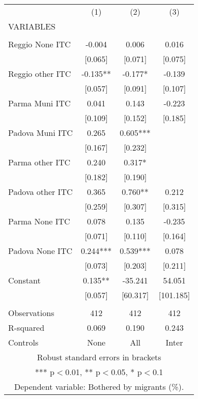 \begin{tabular}{lccc} \hline
 & (1) & (2) & (3) \\
VARIABLES &  &  &  \\ \hline
 &  &  &  \\
Reggio None ITC & -0.004 & 0.006 & 0.016 \\
 & [0.065] & [0.071] & [0.075] \\
Reggio other ITC & -0.135** & -0.177* & -0.139 \\
 & [0.057] & [0.091] & [0.107] \\
Parma Muni ITC & 0.041 & 0.143 & -0.223 \\
 & [0.109] & [0.152] & [0.185] \\
Padova Muni ITC & 0.265 & 0.605*** &  \\
 & [0.167] & [0.232] &  \\
Parma other ITC & 0.240 & 0.317* &  \\
 & [0.182] & [0.190] &  \\
Padova other ITC & 0.365 & 0.760** & 0.212 \\
 & [0.259] & [0.307] & [0.315] \\
Parma None ITC & 0.078 & 0.135 & -0.235 \\
 & [0.071] & [0.110] & [0.164] \\
Padova None ITC & 0.244*** & 0.539*** & 0.078 \\
 & [0.073] & [0.203] & [0.211] \\
Constant & 0.135** & -35.241 & 54.051 \\
 & [0.057] & [60.317] & [101.185] \\
 &  &  &  \\
Observations & 412 & 412 & 412 \\
R-squared & 0.069 & 0.190 & 0.243 \\
 Controls & None & All & Inter \\ \hline
\multicolumn{4}{c}{ Robust standard errors in brackets} \\
\multicolumn{4}{c}{ *** p$<$0.01, ** p$<$0.05, * p$<$0.1} \\
\multicolumn{4}{c}{ Dependent variable: Bothered by migrants (\%).} \\
\end{tabular}
